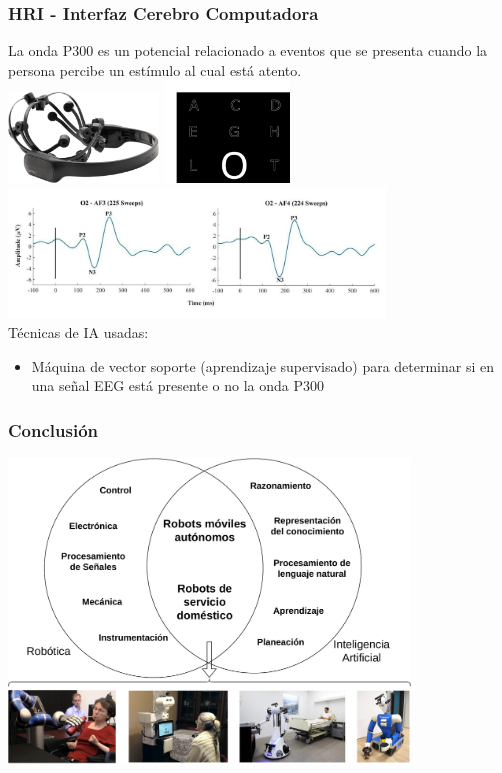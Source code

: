 \documentclass[10pt,spanish,aspectratio=1610]{beamer}
\begin{document}
\begin{frame}\frametitle{HRI - Interfaz Cerebro Computadora}
  La onda P300 es un potencial relacionado a eventos que se presenta cuando la persona percibe un estímulo al cual está atento.\\ 
  \centering
  \includegraphics[width=0.3\textwidth]{Figures/Emotiv.png}
  \includegraphics[width=0.25\textwidth]{Figures/BCI2.png}
  \includegraphics[width=0.75\textwidth]{Figures/P300.jpg}\\
  Técnicas de IA usadas:
  \begin{itemize}
  \item Máquina de vector soporte (aprendizaje supervisado) para determinar si en una señal EEG está presente o no la onda P300
  \end{itemize}
\end{frame}

\begin{frame}\frametitle{Conclusión}
  \centering
  \includegraphics[width=0.8\textwidth]{Figures/RoboticsAndAI.pdf}
\end{frame}
\end{document}
